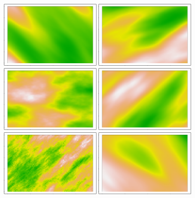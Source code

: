 \documentclass[article,nojss]{jss}\usepackage[]{graphicx}\usepackage[]{color}
\newenvironment{knitrout}{}{} %
\begin{document}
\begin{figure}[H]
\begin{knitrout}
\includegraphics[width=0.45\textwidth]{figure/maternplot-4} 
\includegraphics[width=0.45\textwidth]{figure/maternplot-5} 
\includegraphics[width=0.45\textwidth]{figure/maternplot-6} 
\includegraphics[width=0.45\textwidth]{figure/maternplot-7} 
\includegraphics[width=0.45\textwidth]{figure/maternplot-8} 
\includegraphics[width=0.45\textwidth]{figure/maternplot-9} 

\end{knitrout}
\end{figure}
\end{document}

